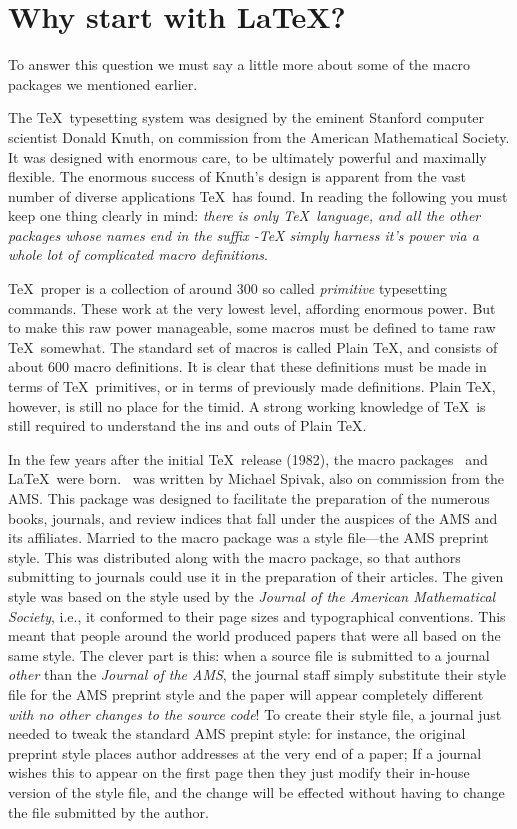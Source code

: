 \section{Why start with \LaTeX?}
To answer this question we must say a little more about
some of  the macro packages we mentioned earlier.

The \TeX\ typesetting system was designed by the eminent Stanford
computer scientist Donald Knuth, on commission from the American
Mathematical Society.  It was designed with enormous care, to be
ultimately powerful and maximally flexible.  The enormous success
of Knuth's design is apparent from the vast number of diverse applications
\TeX\ has found.  In reading the following you must keep one thing clearly
in mind:  {\em there is only \TeX\ language, and all the other packages whose
names end in the suffix \mbox{-\TeX} simply harness it's power via a whole
lot of complicated macro definitions}.

\TeX\ proper is a collection of around 300 so called {\em primitive\/}
typesetting commands.  These work at the very lowest level, affording
enormous power.  But to make this raw power manageable, some macros
must be defined to tame raw \TeX\ somewhat.  The standard set
of macros is called Plain \TeX, and consists of about 600 macro definitions.
It is clear that these definitions must be made in terms of \TeX\ primitives,
or in terms of previously made definitions.  Plain \TeX, however, is still
no place for the timid.  A strong working knowledge of \TeX\ is still required
to understand the ins and outs of Plain \TeX.

In the few years after the initial \TeX\ release (1982), the macro packages
\AmSTeX\ and \LaTeX\ were born.  \AmSTeX\ was written by Michael
Spivak, also on commission from the AMS.  This package was designed to
facilitate the preparation of the numerous books, journals, and review
indices that fall under the auspices of the AMS and its affiliates.
Married to the macro package was a style file---the AMS preprint style.
This was distributed along with the macro package, so that authors
submitting to journals could use it in the preparation of their articles.
The given style was based on the style used by the {\em Journal of the
American Mathematical Society}, i.e., it conformed to their page sizes
and typographical conventions.  This meant that people around the world
produced papers that were all based on the same style.  The clever part
is this:  when a source file is submitted to a journal {\em other\/} than
the {\em  Journal of the AMS}, the journal staff simply substitute their
style file for the AMS preprint style and the paper will appear completely
different {\em with no other changes to the source code\/}!  To create
their style file, a journal just needed to tweak the standard AMS prepint
style:  for instance, the original preprint style places author addresses
at the very end of a paper;  If a journal wishes this to appear on the first
page then they just modify their in-house version of the style file, and
the change will be effected without having to change the file submitted
by the author.


